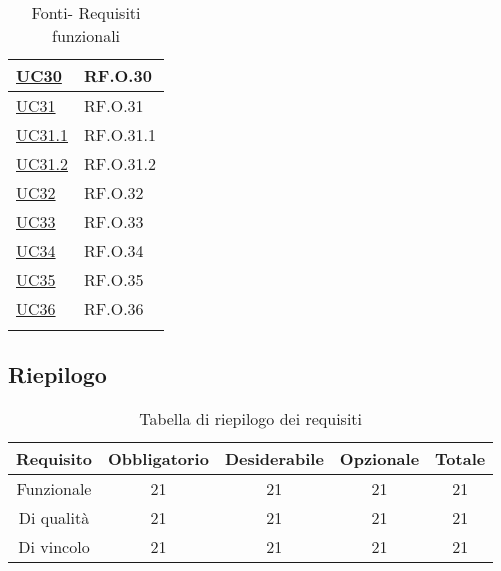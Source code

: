 \begin{longtable}{|P{4,5cm}|>{\arraybackslash}P{9cm}|}
  \hline
  \hyperref[UC30]{UC30} & RF.O.30 \\
  \hline
  \hyperref[UC31]{UC31} & RF.O.31 \\
  \hline
  \hyperref[UC31point1]{UC31.1} & RF.O.31.1 \\
  \hline
  \hyperref[UC31point2]{UC31.2} & RF.O.31.2 \\
  \hline
  \hyperref[UC32]{UC32} & RF.O.32 \\
  \hline
  \hyperref[UC33]{UC33} & RF.O.33 \\
  \hline
  \hyperref[UC34]{UC34} & RF.O.34 \\
  \hline
  \hyperref[UC35]{UC35} & RF.O.35\\
  \hline
  \hyperref[UC36]{UC36} & RF.O.36 \\
  \hline
\caption{Fonti- Requisiti funzionali}
\end{longtable}

\subsection{Riepilogo}

\begin{table}[H]
	\centering
  \begin{tabular}{|c|c|c|c|c|}
    \hline
		\textbf{Requisito} & \textbf{Obbligatorio} & \textbf{Desiderabile} & \textbf{Opzionale} & \textbf{Totale} \\ 
    \hline
    Funzionale & 21 & 21 & 21 & 21 \\
    \hline
    Di qualità & 21 & 21 & 21 & 21 \\
    \hline 
    Di vincolo & 21 & 21 & 21 & 21 \\
    \hline
  \end{tabular}
  \caption{Tabella di riepilogo dei requisiti}
\end{table}
